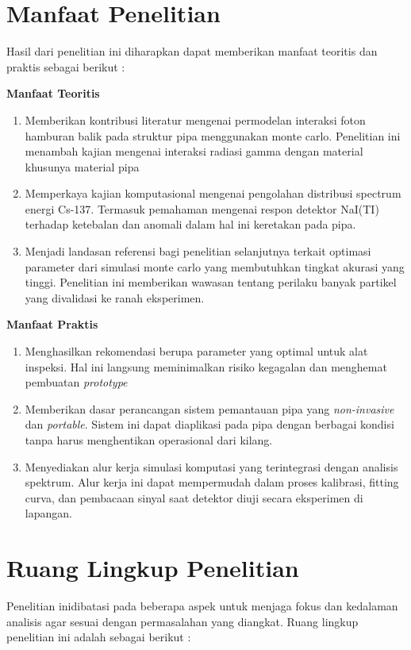 \documentclass[12pt,a4paper]{report}
\begin{document}
\section{Manfaat Penelitian}
Hasil dari penelitian ini diharapkan dapat memberikan manfaat teoritis dan praktis sebagai berikut :

\textbf{Manfaat Teoritis}

\begin{enumerate}
    \item  Memberikan kontribusi literatur mengenai permodelan interaksi foton hamburan balik pada struktur pipa menggunakan monte carlo. Penelitian ini menambah kajian mengenai interaksi radiasi gamma dengan material khusunya material pipa
    \item Memperkaya kajian komputasional mengenai pengolahan distribusi spectrum energi Cs-137. Termasuk pemahaman mengenai respon detektor NaI(TI) terhadap ketebalan dan anomali dalam hal ini keretakan pada pipa.
    \item Menjadi landasan referensi bagi penelitian selanjutnya terkait optimasi parameter dari simulasi monte carlo yang membutuhkan tingkat akurasi yang tinggi. Penelitian ini memberikan wawasan tentang perilaku banyak partikel yang divalidasi ke ranah eksperimen.
\end{enumerate}

\textbf{Manfaat Praktis}

\begin{enumerate}
    \item Menghasilkan rekomendasi berupa parameter yang optimal untuk alat inspeksi. Hal ini langsung meminimalkan risiko kegagalan dan menghemat pembuatan \textit{prototype}
    \item Memberikan dasar perancangan sistem pemantauan pipa yang \textit{non-invasive} dan \textit{portable}. Sistem ini dapat diaplikasi pada pipa dengan berbagai kondisi tanpa harus menghentikan operasional dari kilang.
    \item Menyediakan alur kerja simulasi komputasi yang terintegrasi dengan analisis spektrum. Alur kerja ini dapat mempermudah dalam proses kalibrasi, fitting curva, dan pembacaan sinyal saat detektor diuji secara eksperimen di lapangan.
\end{enumerate}


\section{Ruang Lingkup Penelitian}
Penelitian inidibatasi pada beberapa aspek untuk menjaga fokus dan kedalaman analisis agar sesuai dengan permasalahan yang diangkat. Ruang lingkup penelitian ini adalah sebagai berikut :
\end{document}
